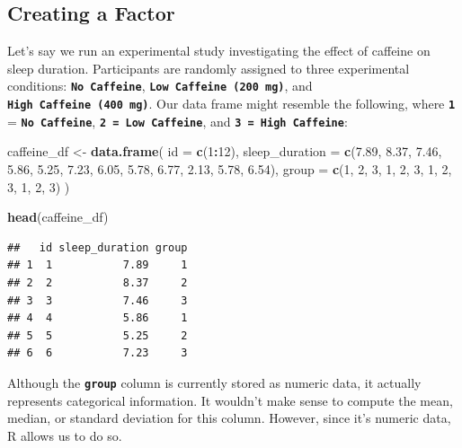 \documentclass[
]{book}
\newenvironment{Shaded}{\begin{snugshade}}{\end{snugshade}}
\newcommand{\AttributeTok}[1]{\textcolor[rgb]{0.13,0.29,0.53}{#1}}
\newcommand{\DecValTok}[1]{\textcolor[rgb]{0.00,0.00,0.81}{#1}}
\newcommand{\FloatTok}[1]{\textcolor[rgb]{0.00,0.00,0.81}{#1}}
\newcommand{\FunctionTok}[1]{\textcolor[rgb]{0.13,0.29,0.53}{\textbf{#1}}}
\newcommand{\NormalTok}[1]{#1}
\newcommand{\OtherTok}[1]{\textcolor[rgb]{0.56,0.35,0.01}{#1}}
\newcommand{\SpecialCharTok}[1]{\textcolor[rgb]{0.81,0.36,0.00}{\textbf{#1}}}
\begin{document}
\hypertarget{creating-a-factor}{%
\subsection{Creating a Factor}\label{creating-a-factor}}

Let's say we run an experimental study investigating the effect of caffeine on sleep duration. Participants are randomly assigned to three experimental conditions: \textbf{\texttt{No\ Caffeine}}, \textbf{\texttt{Low\ Caffeine\ (200\ mg)}}, and \textbf{\texttt{High\ Caffeine\ (400\ mg)}}. Our data frame might resemble the following, where \textbf{\texttt{1}} = \textbf{\texttt{No\ Caffeine}}, \textbf{\texttt{2\ =\ Low\ Caffeine}}, and \textbf{\texttt{3\ =\ High\ Caffeine}}:

\begin{Shaded}
\begin{Highlighting}[]
\NormalTok{caffeine\_df }\OtherTok{\textless{}{-}} \FunctionTok{data.frame}\NormalTok{(}
  \AttributeTok{id =} \FunctionTok{c}\NormalTok{(}\DecValTok{1}\SpecialCharTok{:}\DecValTok{12}\NormalTok{),}
  \AttributeTok{sleep\_duration =} \FunctionTok{c}\NormalTok{(}\FloatTok{7.89}\NormalTok{, }\FloatTok{8.37}\NormalTok{, }\FloatTok{7.46}\NormalTok{, }\FloatTok{5.86}\NormalTok{, }\FloatTok{5.25}\NormalTok{, }\FloatTok{7.23}\NormalTok{, }\FloatTok{6.05}\NormalTok{, }\FloatTok{5.78}\NormalTok{, }\FloatTok{6.77}\NormalTok{, }\FloatTok{2.13}\NormalTok{, }\FloatTok{5.78}\NormalTok{,  }\FloatTok{6.54}\NormalTok{),}
  \AttributeTok{group =} \FunctionTok{c}\NormalTok{(}\DecValTok{1}\NormalTok{, }\DecValTok{2}\NormalTok{, }\DecValTok{3}\NormalTok{, }\DecValTok{1}\NormalTok{, }\DecValTok{2}\NormalTok{, }\DecValTok{3}\NormalTok{, }\DecValTok{1}\NormalTok{, }\DecValTok{2}\NormalTok{, }\DecValTok{3}\NormalTok{, }\DecValTok{1}\NormalTok{, }\DecValTok{2}\NormalTok{, }\DecValTok{3}\NormalTok{)}
\NormalTok{)}

\FunctionTok{head}\NormalTok{(caffeine\_df)}
\end{Highlighting}
\end{Shaded}

\begin{verbatim}
##   id sleep_duration group
## 1  1           7.89     1
## 2  2           8.37     2
## 3  3           7.46     3
## 4  4           5.86     1
## 5  5           5.25     2
## 6  6           7.23     3
\end{verbatim}

Although the \textbf{\texttt{group}} column is currently stored as numeric data, it actually represents categorical information. It wouldn't make sense to compute the mean, median, or standard deviation for this column. However, since it's numeric data, R allows us to do so.
\end{document}
